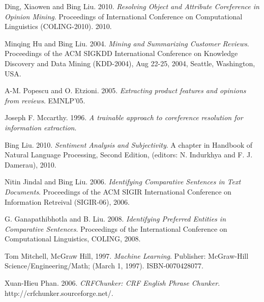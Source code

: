 \documentclass[12pt]{extarticle}
\begin{document}
\newpage
\begin{thebibliography}{30}

	Ding, Xiaowen and Bing Liu. 2010.
	\textit{Resolving Object and Attribute Coreference in Opinion Mining}. 
	Proceedings of International Conference on Computational Linguistics (COLING-2010). 2010.
	 
	Minqing Hu and Bing Liu. 2004.
	\textit{Mining and Summarizing Customer Reviews}.
	Proceedings of the ACM SIGKDD International Conference on Knowledge Discovery and Data Mining (KDD-2004), Aug 22-25, 2004, Seattle, Washington, USA.

	A-M. Popescu and O. Etzioni. 2005. 
	\textit{Extracting product features and opinions from reviews}.
	EMNLP’05.

	Joseph F. Mccarthy. 1996.
 	\textit{A trainable approach to coreference resolution for information extraction}.

 	Bing Liu. 2010.
 	\textit{Sentiment Analysis and Subjectivity}. A chapter in 
  	Handbook of Natural Language Processing, Second Edition, 
  	(editors: N. Indurkhya and F. J. Damerau), 2010.

  	Nitin Jindal and Bing Liu. 2006.  
  	\textit{Identifying Comparative Sentences in Text Documents}. 
   	Proceedings of the ACM SIGIR International Conference on 
   	Information Retreival (SIGIR-06), 2006.

	G. Ganapathibhotla and B. Liu. 2008.
	\textit{Identifying Preferred Entities in Comparative Sentences}.
	Proceedings of the International Conference on Computational Linguistics, COLING, 2008.

	Tom Mitchell, McGraw Hill, 1997.
	\textit{Machine Learning}.
	Publisher: McGraw-Hill Science/Engineering/Math; (March 1, 1997). ISBN-0070428077.	

	Xuan-Hieu Phan. 2006.
	\textit{CRFChunker: CRF English Phrase Chunker}. 
	http://crfchunker.sourceforge.net/.
 
\end{thebibliography}	
\end{document}
